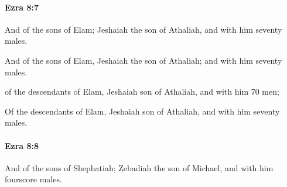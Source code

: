 		\paragraph{Ezra 8:7} %
			\label{EZRA-8-7}

			And of the sons of Elam; Jeshaiah the son of Athaliah, and with him seventy males.

			\begin{versebox}
					\item[BHS] 
					\item[LXX] 
					\item[ASV] And of the sons of Elam, Jeshaiah the son of Athaliah; and with him seventy males.
					\item[NIV] of the descendants of Elam, Jeshaiah son of Athaliah, and with him 70 men;
					\item[NRSV] Of the descendants of Elam, Jeshaiah son of Athaliah, and with him seventy males.
			\end{versebox}

		\paragraph{Ezra 8:8} %
			\label{EZRA-8-8}

			And of the sons of Shephatiah; Zebadiah the son of Michael, and with him fourscore males.

